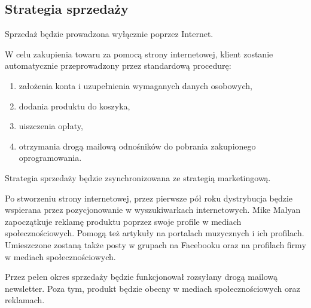 \documentclass[12pt]{article}
\begin{document}

\subsection{Strategia sprzedaży}


Sprzedaż będzie prowadzona wyłącznie poprzez Internet.

W celu zakupienia towaru za pomocą strony internetowej, klient zostanie automatycznie przeprowadzony przez standardową procedurę:
\begin{enumerate}
    \item założenia konta i uzupełnienia wymaganych danych osobowych,
    \item dodania produktu do koszyka,
    \item uiszczenia opłaty,
    \item otrzymania drogą mailową odnośników do pobrania zakupionego oprogramowania.
\end{enumerate}

Strategia sprzedaży będzie zsynchronizowana ze strategią marketingową.

Po stworzeniu strony internetowej, przez pierwsze pół roku dystrybucja będzie wspierana przez pozycjonowanie w wyszukiwarkach internetowych.
Mike Malyan zapoczątkuje reklamę produktu poprzez swoje profile w mediach społecznościowych.
Pomogą też artykuły na portalach muzycznych i ich profilach.
Umieszczone zostaną także posty w grupach na Facebooku oraz na profilach firmy w mediach społecznościowych.

Przez pełen okres sprzedaży będzie funkcjonował rozsyłany drogą mailową newsletter.
Poza tym, produkt będzie obecny w mediach społecznościowych oraz reklamach.
\end{document}
